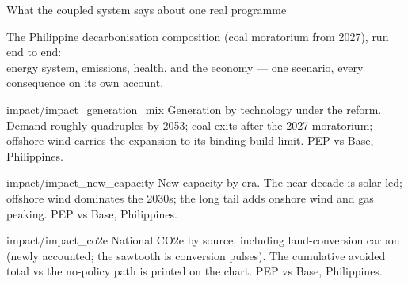 %
%

\begin{frame}[plain]
  \vfill
  {\Large\color{ink}What the coupled system says about
   one real programme}\par\vspace{6pt}
  {\small\color{sub}The Philippine decarbonisation composition (coal moratorium
   from 2027), run end to end:\\ energy system, emissions, health, and the
   economy --- one scenario, every consequence on its own account.}\par
  \vfill
\end{frame}

%
  {impact/impact_generation_mix}%
  {Generation by technology under the reform. Demand roughly quadruples by 2053;
   coal exits after the 2027 moratorium; offshore wind carries the expansion to
   its binding build limit. PEP vs Base, Philippines.}

%
  {impact/impact_new_capacity}%
  {New capacity by era. The near decade is solar-led; offshore wind dominates
   the 2030s; the long tail adds onshore wind and gas peaking. PEP vs Base, Philippines.}

%
  {impact/impact_co2e}%
  {National CO2e by source, including land-conversion carbon (newly accounted;
   the sawtooth is conversion pulses). The cumulative avoided total vs the
   no-policy path is printed on the chart. PEP vs Base, Philippines.}

